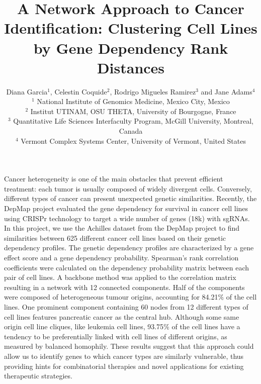\documentclass[12pt]{article}
\begin{document}
\title{\normalsize\bf \vspace{-10ex}
A Network Approach to Cancer Identification: Clustering Cell Lines by Gene Dependency Rank Distances}

\begingroup\onehalfspacing
\author{\vspace{-3ex}Diana Garcia$^1$, Celestin Coquide$^2$, Rodrigo Migueles Ramirez$^3$ and Jane Adams$^4$\\
\footnotesize
\vspace{-1ex}
$^1$ National Institute of Genomics Medicine, Mexico City, Mexico\\ 
$^2$ Institut UTINAM, OSU THETA, University of Bourgogne, France\\
$^3$ Quantitative Life Sciences Interfaculty Program, McGill University, Montreal, Canada\\
$^4$ Vermont Complex Systems Center, University of Vermont, United States}
\endgroup



\date{\vspace{-7ex}} %

\maketitle

\thispagestyle{empty}
\pagestyle{empty}
Cancer heterogeneity is one of the main obstacles that prevent efficient treatment: each tumor is usually composed of widely divergent cells. Conversely, different types of cancer can present unexpected genetic similarities. Recently, the DepMap project \cite{Tsherniak17} evaluated the gene dependency for survival in cancer cell lines using CRISPr technology to target a wide number of genes (18k) with sgRNAs. In this project, we use the Achilles dataset from the DepMap project to find similarities between 625 different cancer cell lines based on their genetic dependency profiles. The genetic dependency profiles are characterized by a gene effect score and a gene dependency probability. Spearman’s rank correlation coefficients were calculated on the dependency probability matrix between each pair of cell lines. A backbone method  \cite{Serrano09} was applied to the correlation matrix resulting in a network with 12 connected components. Half of the components were composed of heterogeneous tumour origins, accounting for 84.21$\%$ of the cell lines. One prominent component containing 60 nodes from 12 different types of cell lines features pancreatic cancer as the central hub. Although some same origin cell line cliques, like leukemia cell lines, 93.75$\%$ of the cell lines have a tendency to be preferentially linked with cell lines of different origins, as measured by balanced homophily. These results suggest that this approach could allow us to identify genes to which cancer types are similarly vulnerable, thus providing hints for combinatorial therapies and novel applications for existing therapeutic strategies. 
\end{document}
